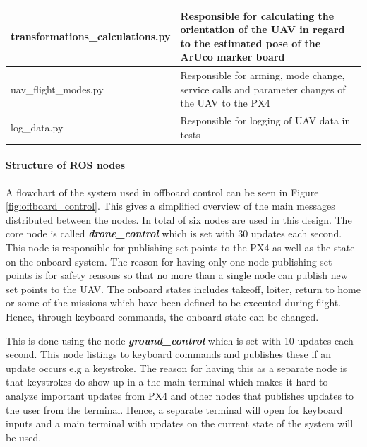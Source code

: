 \documentclass[../Head/report.tex]{subfiles}
\begin{document}
\begin{table}[H]
\begin{center}
\begin{tabularx}{\textwidth}[t]{XX}
\hline
transformations\_calculations.py &
\begin{minipage}[t]{\linewidth}%
Responsible for calculating the orientation of the UAV in regard to the estimated pose of the ArUco marker board   
\end{minipage}\vspace{0.5em}\\

\hline
uav\_flight\_modes.py &
\begin{minipage}[t]{\linewidth}%
Responsible for arming, mode change, service calls and parameter changes of the UAV to the PX4    
\end{minipage}\vspace{0.5em}\\

\hline
log\_data.py &
\begin{minipage}[t]{\linewidth}%
Responsible for logging of UAV data in tests   
\end{minipage}\\
\end{tabularx}
\end{center}
\end{table}
\renewcommand{\arraystretch}{1.0}

\paragraph{Structure of ROS nodes}
\label{sec:structure_of_ros_nodes}

A flowchart of the system used in offboard control can be seen in Figure \ref{fig:offboard_control}. This gives a simplified overview of the main messages distributed between the nodes. In total of six nodes are used in this design. The core node is called \textit{\textbf{drone\_control}} which is set with 30 updates each second. This node is responsible for publishing set points to the PX4 as well as the state on the onboard system. The reason for having only one node publishing set points is for safety reasons so that no more than a single node can publish new set points to the UAV. The onboard states includes takeoff, loiter, return to home or some of the missions which have been defined to be executed during flight. Hence, through keyboard commands, the onboard state can be changed. 

This is done using the node \textit{\textbf{ground\_control}} which is set with 10 updates each second. This node listings to keyboard commands and publishes these if an update occurs e.g a keystroke. The reason for having this as a separate node is that keystrokes do show up in a the main terminal which makes it hard to analyze important updates from PX4 and other nodes that publishes updates to the user from the terminal. Hence, a separate terminal will open for keyboard inputs and a main terminal with updates on the current state of the system will be used. 
\end{document}
